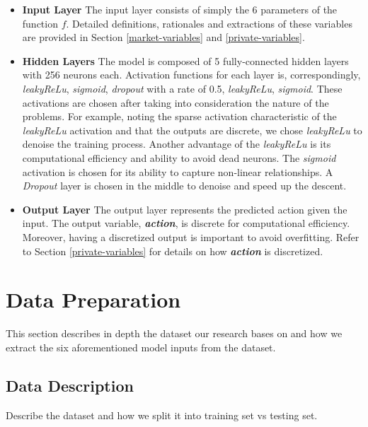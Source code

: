 \documentclass[12pt]{extarticle}
\begin{document}
\begin{itemize}
\item \textbf{Input Layer} The input layer consists of simply the 6 parameters of the function $f$.
Detailed definitions, rationales and extractions of these variables are
provided in Section \ref{market-variables} and \ref{private-variables}.

\item \textbf{Hidden Layers} The model is composed of 5 fully-connected hidden layers with
256 neurons each. Activation functions for each layer is, correspondingly,
\textit{leakyReLu},
\textit{sigmoid}, \textit{dropout} with a rate of 0.5,
\textit{leakyReLu}, \textit{sigmoid}. These activations are
chosen after taking into consideration the nature of the
problems. For example, noting the sparse activation characteristic of
the \textit{leakyReLu} activation and that the outputs are discrete, we chose \textit{leakyReLu}
to denoise the training process. Another advantage of the \textit{leakyReLu}
is its computational efficiency and ability to avoid dead neurons.
The \textit{sigmoid} activation is chosen for its ability to capture
non-linear relationships. A \textit{Dropout} layer is chosen
in the middle to denoise and speed up the descent. \\

\item \textbf{Output Layer} The output layer represents the predicted action given
the input. The output variable, \textit{\textbf{action}}, is discrete for computational
efficiency. Moreover, having a discretized output is important to avoid overfitting.
Refer to Section \ref{private-variables} for details on how \textit{\textbf{action}}
is discretized.

\end{itemize}


\section{Data Preparation}
This section describes in depth the dataset our research bases on and
how we extract the six aforementioned model inputs from the dataset.

\subsection{Data Description}

Describe the dataset and how we split it into training set vs testing set.
\end{document}
